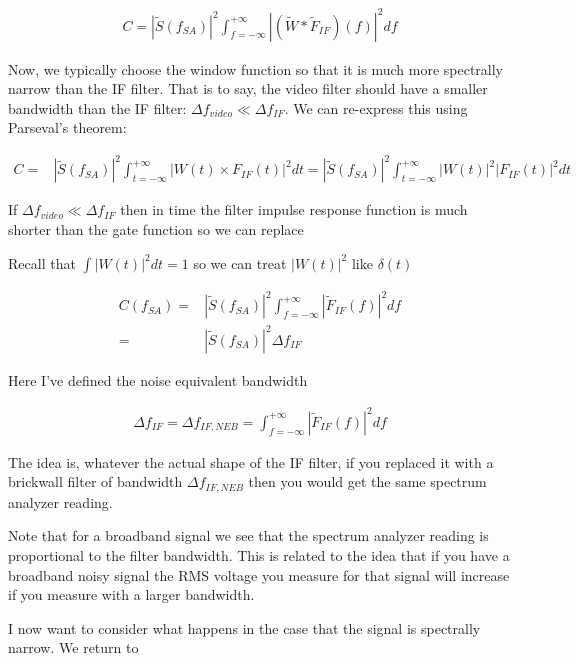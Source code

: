\documentclass[12pt]{article}
\begin{document}
\begin{align}
C = |\tilde{S}(f_{SA})|^2 \int_{f=-\infty}^{+\infty} \left|\left(\tilde{W} \ast \tilde{F}_{IF}\right)(f)\right|^2 df
\end{align}

Now, we typically choose the window function so that it is much more spectrally narrow than the IF filter.
That is to say, the video filter should have a smaller bandwidth than the IF filter: $\Delta f_{video} \ll \Delta f_{IF}$.
We can re-express this using Parseval's theorem:

\begin{align}
C =& \left|\tilde{S}(f_{SA})\right|^2 \int_{t=-\infty}^{+\infty} \left|W(t) \times F_{IF}(t)\right|^2 dt = \left|\tilde{S}(f_{SA})\right|^2 \int_{t=-\infty}^{+\infty} |W(t)|^2 |F_{IF}(t)|^2 dt
\end{align}

If $\Delta f_{video} \ll \Delta f_{IF}$ then in time the filter impulse response function is much shorter than the gate function so we can replace


Recall that $\int |W(t)|^2 dt = 1$ so we can treat $|W(t)|^2$ like $\delta(t)$

\begin{align}
C(f_{SA}) =& \left|\tilde{S}(f_{SA})\right|^2 \int_{f=-\infty}^{+\infty} \left|\tilde{F}_{IF}(f)\right|^2 df\\
=& \left|\tilde{S}(f_{SA})\right|^2 \Delta f_{IF}
\end{align}

Here I've defined the noise equivalent bandwidth

\begin{align}
\Delta f_{IF} = \Delta f_{IF, NEB} = \int_{f=-\infty}^{+\infty} \left|\tilde{F}_{IF}(f)\right|^2 df
\end{align}

The idea is, whatever the actual shape of the IF filter, if you replaced it with a brickwall filter of bandwidth $\Delta f_{IF,NEB}$ then you would get the same spectrum analyzer reading.

Note that for a broadband signal we see that the spectrum analyzer reading is proportional to the filter bandwidth. 
This is related to the idea that if you have a broadband noisy signal the RMS voltage you measure for that signal will increase if you measure with a larger bandwidth.

I now want to consider what happens in the case that the signal is spectrally narrow.
We return to
\end{document}
